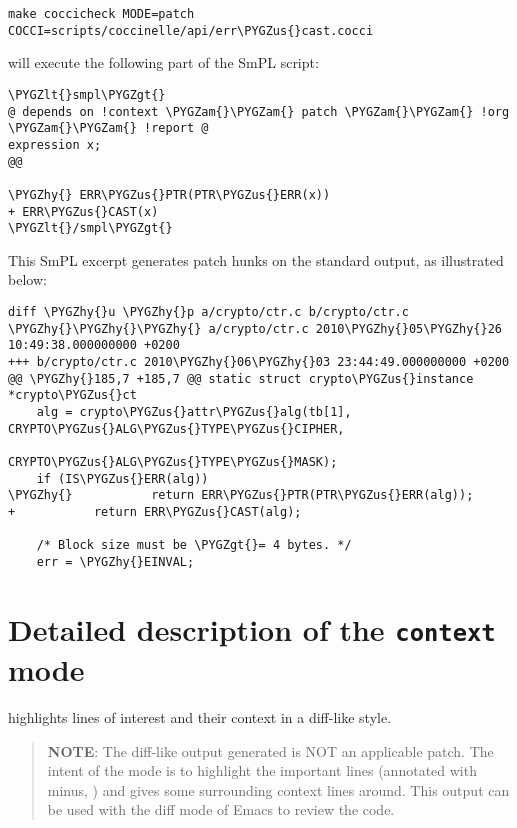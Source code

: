 \documentclass[a4paper,8pt,english]{sphinxmanual}
\def\PYGZus{\char`\_}
\def\PYGZam{\char`\&}
\def\PYGZlt{\char`\<}
\def\PYGZgt{\char`\>}
\def\PYGZhy{\char`\-}
\begin{document}
\begin{Verbatim}[commandchars=\\\{\}]
make coccicheck MODE=patch COCCI=scripts/coccinelle/api/err\PYGZus{}cast.cocci
\end{Verbatim}

will execute the following part of the SmPL script:

\begin{Verbatim}[commandchars=\\\{\}]
\PYGZlt{}smpl\PYGZgt{}
@ depends on !context \PYGZam{}\PYGZam{} patch \PYGZam{}\PYGZam{} !org \PYGZam{}\PYGZam{} !report @
expression x;
@@

\PYGZhy{} ERR\PYGZus{}PTR(PTR\PYGZus{}ERR(x))
+ ERR\PYGZus{}CAST(x)
\PYGZlt{}/smpl\PYGZgt{}
\end{Verbatim}

This SmPL excerpt generates patch hunks on the standard output, as
illustrated below:

\begin{Verbatim}[commandchars=\\\{\}]
diff \PYGZhy{}u \PYGZhy{}p a/crypto/ctr.c b/crypto/ctr.c
\PYGZhy{}\PYGZhy{}\PYGZhy{} a/crypto/ctr.c 2010\PYGZhy{}05\PYGZhy{}26 10:49:38.000000000 +0200
+++ b/crypto/ctr.c 2010\PYGZhy{}06\PYGZhy{}03 23:44:49.000000000 +0200
@@ \PYGZhy{}185,7 +185,7 @@ static struct crypto\PYGZus{}instance *crypto\PYGZus{}ct
    alg = crypto\PYGZus{}attr\PYGZus{}alg(tb[1], CRYPTO\PYGZus{}ALG\PYGZus{}TYPE\PYGZus{}CIPHER,
                              CRYPTO\PYGZus{}ALG\PYGZus{}TYPE\PYGZus{}MASK);
    if (IS\PYGZus{}ERR(alg))
\PYGZhy{}           return ERR\PYGZus{}PTR(PTR\PYGZus{}ERR(alg));
+           return ERR\PYGZus{}CAST(alg);

    /* Block size must be \PYGZgt{}= 4 bytes. */
    err = \PYGZhy{}EINVAL;
\end{Verbatim}


\section{Detailed description of the \texttt{context} mode}
\label{dev-tools/coccinelle:detailed-description-of-the-context-mode}
 highlights lines of interest and their context
in a diff-like style.
\begin{quote}

\textbf{NOTE}: The diff-like output generated is NOT an applicable patch. The
intent of the  mode is to highlight the important lines
(annotated with minus, \sphinxcode{-}) and gives some surrounding context
lines around. This output can be used with the diff mode of
Emacs to review the code.
\end{quote}
\end{document}
